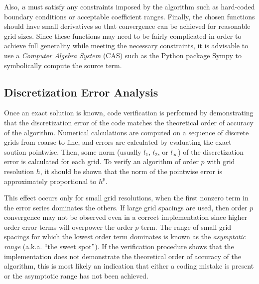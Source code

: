 \documentclass[ms,cpyr,lof,lot]{uathesis}
\begin{document}
Also, $u$ must satisfy any constraints imposed by the algorithm such as hard-coded boundary conditions or acceptable coefficient ranges.
Finally, the chosen functions should have small derivatives so that convergence can be achieved for reasonable grid sizes.
Since these functions may need to be fairly complicated in order to achieve full generality while meeting the necessary constraints, it is advisable to use a \textit{Computer Algebra System} (CAS) such as the Python package Sympy to symbolically compute the source term. %

\subsection{Discretization Error Analysis}
Once an exact solution is known, code verification is performed by demonstrating that the discretization error of the code matches the theoretical order of accuracy of the algorithm.
Numerical calculations are computed on a sequence of discrete grids from coarse to fine, and errors are calculated by evaluating the exact soution pointwise.
Then, some norm (usually $l_1$, $l_2$, or $l_\infty$) of the discretization error is calculated for each grid.
To verify an algorithm of order $p$ with grid resolution $h$, it should be shown that the norm of the pointwise error is approximately proportional to $h^p$.

This effect occurs only for small grid resolutions, when the first nonzero term in the error series dominates the others.
If large grid spacings are used, then order $p$ convergence may not be observed even in a correct implementation since higher order error terms will overpower the order $p$ term.
The range of small grid spacings for which the lowest order term dominates is known as the \textit{asymptotic range} (a.k.a. ``the sweet spot'').
If the verification procedure shows that the implementation does not demonstrate the theoretical order of accuracy of the algorithm, this is most likely an indication that either a coding mistake is present or the asymptotic range has not been achieved. %
\end{document}
